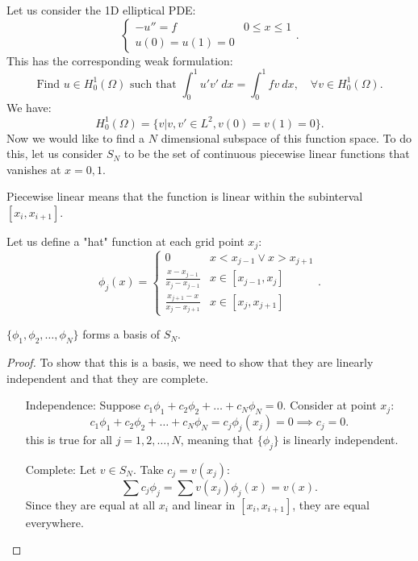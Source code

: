 \documentclass[../main/main.tex]{subfiles}
\begin{document}
Let us consider the 1D elliptical PDE: \[
\begin{cases}
    -u'' = f & 0 \le  x \le  1 \\
    u(0) = u(1) = 0
\end{cases}
.\] 
This has the corresponding weak formulation: \[
    \text{Find }u \in  H^1_0(\Omega) \text{ such that } \int^1_0 u' v'~dx = \int^1_0 f v ~dx, \quad \forall  v \in  H^1_0(\Omega)
.\] 
We have: \[
    H^1_0(\Omega) = \{v| v,v' \in L^2, v(0) = v(1) = 0\} 
.\] 
Now we would like to find a $N$ dimensional subspace of this function space. To do this, let us consider $S_N$ to be the set of continuous piecewise linear functions that vanishes at $x = 0,1$.
\begin{remark}
    Piecewise linear means that the function is linear within the subinterval $[x_i,x_{i+1}]$.
\end{remark} 
   Let us define a "hat" function at each grid point $x_j$: \[
       \phi_j(x) = \begin{cases}
           0 & x < x_{j-1} \lor x > x_{j+1} \\
           \frac{x-x_{j-1}}{x_j-x_{j-1}} & x \in  [x_{j-1}, x_j] \\
           \frac{x_{j+1}-x}{x_j-x_{j+1}} & x \in  [x_{j}, x_{j+1}]
       \end{cases}
   .\] \begin{claim}
       $\{\phi_1,\phi_2,\ldots,\phi_N\} $ forms a basis of $S_N$.  
   \end{claim}
   \begin{proof}
      To show that this is a basis, we need to show that they are linearly independent and that they are complete. 
      \begin{enumerate}
          \item[Independence:] Suppose $ c_1\phi_1 + c_2\phi_2 + \ldots + c_N \phi_N = 0$. Consider at point $x_j$: \[
                  c_1\phi_1 + c_2\phi_2 + \ldots + c_N \phi_N = c_j \phi_j(x_j) = 0 \implies c_j = 0
          .\]  this is true for all $j=1,2,\ldots,N$, meaning that $\{\phi_j\} $ is linearly independent.
      \item[Complete:] Let $v\in  S_N$. Take $c_j = v(x_j)$: \[
              \sum c_j \phi_j = \sum v(x_j) \phi_j(x) = v(x)
          .\] Since they are equal at all $x_i$ and linear in  $[x_i,x_{i+1}]$, they are equal everywhere.
      \end{enumerate}
   \end{proof}
\end{document}
